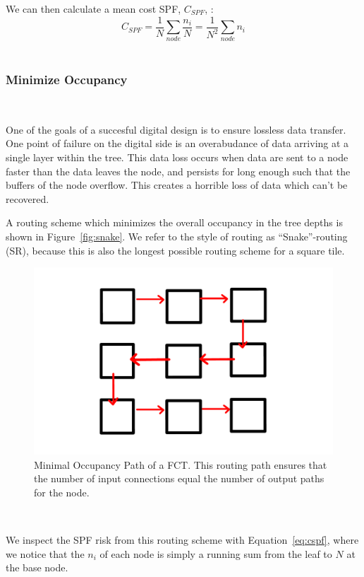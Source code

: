 We can then calculate a mean cost SPF, $C_{SPF}$, :
\begin{equation}
  C_{SPF} = \frac{1}{N}\sum_{node} \frac{n_{i}}{N} = \frac{1}{N^{2}}\sum_{node} n_{i}
\end{equation}~\label{eq:cspf}

\subsubsection{Minimize Occupancy}~\label{sec:min_conn}

One of the goals of a succesful digital design is to ensure lossless data transfer.
One point of failure on the digital side is an overabudance of data arriving at a single layer within the tree.
This data loss occurs when data are sent to a node faster than the data leaves the node, and persists for long enough such that the buffers of the node overflow.
This creates a horrible loss of data which can't be recovered.

A routing scheme which minimizes the overall occupancy in the tree depths is shown in Figure~\ref{fig:snake}.
We refer to the style of routing as ``Snake''-routing (SR), because this is also the longest possible routing scheme for a square tile.

\begin{figure}[]
\centering
\includegraphics[width=\textwidth]{images/snakeroute.pdf}
\caption{Minimal Occupancy Path of a FCT. This routing path ensures that the number of input connections equal the number of output paths for the node.}
\end{figure}~\label{fig:snake}

We inspect the SPF risk from this routing scheme with Equation~\ref{eq:cspf}, where we notice that the $n_{i}$ of each node is simply a running sum from the leaf to $N$ at the base node.

